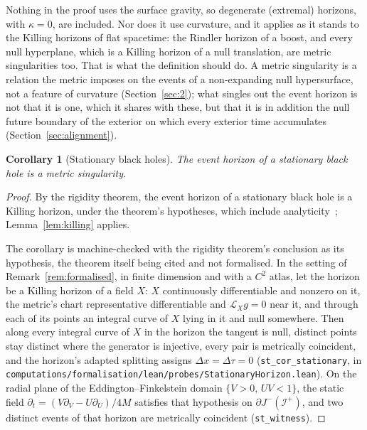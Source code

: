 \documentclass[11pt,a4paper]{article}
\theoremstyle{plain}
\newtheorem{corollary}{Corollary}
\theoremstyle{remark}
\begin{document}
Nothing in the proof uses the surface gravity, so degenerate (extremal) horizons, with $\kappa=0$, are included. Nor does it use curvature, and it applies as it stands to the Killing horizons of flat spacetime: the Rindler horizon of a boost, and every null hyperplane, which is a Killing horizon of a null translation, are metric singularities too. That is what the definition should do. A metric singularity is a relation the metric imposes on the events of a non-expanding null hypersurface, not a feature of curvature (Section~\ref{sec:2}); what singles out the event horizon is not that it is one, which it shares with these, but that it is in addition the null future boundary of the exterior on which every exterior time accumulates (Section~\ref{sec:alignment}).

\begin{corollary}[Stationary black holes]\label{cor:stationary}
The event horizon of a stationary black hole is a metric singularity.
\end{corollary}

\begin{proof}
By the rigidity theorem, the event horizon of a stationary black hole is a Killing horizon, under the theorem's hypotheses, which include analyticity~\cite{Hawking1972,Hawking1973}; Lemma~\ref{lem:killing} applies.

The corollary is machine-checked with the rigidity theorem's conclusion as its hypothesis, the theorem itself being cited and not formalised. In the setting of Remark~\ref{rem:formalised}, in finite dimension and with a $C^{2}$ atlas, let the horizon be a Killing horizon of a field $X$: $X$ continuously differentiable and nonzero on it, the metric's chart representative differentiable and $\mathcal{L}_Xg=0$ near it, and through each of its points an integral curve of $X$ lying in it and null somewhere. Then along every integral curve of $X$ in the horizon the tangent is null, distinct points stay distinct where the generator is injective, every pair is metrically coincident, and the horizon's adapted splitting assigns $\Delta x=\Delta\tau=0$ (\texttt{st\_cor\_stationary}, in \texttt{computations/formalisation/lean/probes/StationaryHorizon.lean}). On the radial plane of the Eddington--Finkelstein domain $\{V>0,\,UV<1\}$, the static field $\partial_t=(V\partial_V-U\partial_U)/4M$ satisfies that hypothesis on $\partial J^-(\mathscr{I}^+)$, and two distinct events of that horizon are metrically coincident (\texttt{st\_witness}).
\end{proof}
\end{document}
